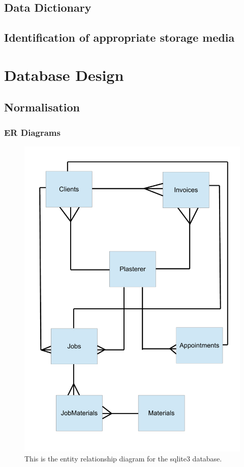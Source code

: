 \subsection{Data Dictionary}

\subsection{Identification of appropriate storage media}

\section{Database Design}

\subsection{Normalisation}

\pagebreak
\subsubsection{ER Diagrams}

\begin{figure}[H]
    \includegraphics[width=\textwidth]{./Analysis/images/ERDiagram.pdf}
    \caption{This is the entity relationship diagram for the sqlite3 database.} \label{fig:Entity_Relationship_Diagram}
\end{figure}

